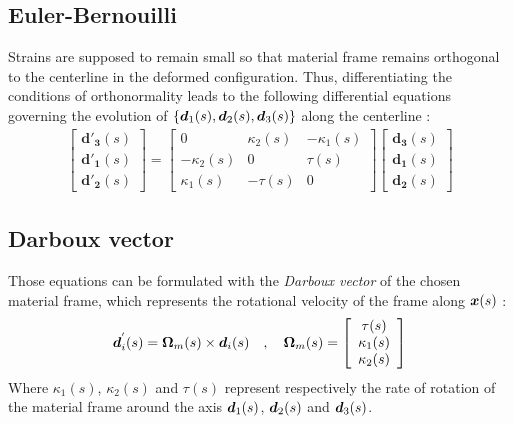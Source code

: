\subsection{Euler-Bernouilli}
Strains are supposed to remain small so that material frame remains orthogonal to the centerline in the deformed configuration. Thus, differentiating the conditions of orthonormality leads to the following differential equations governing the evolution of $\{\boldsymbol{d}_1 (s),\boldsymbol{d}_2 (s),\boldsymbol{d}_3 (s)\}$ along the centerline :
\begin{gather}
\left[\begin{array}{c}
\mathbf{d'_{3}}(s) \\
\mathbf{d'_{1}}(s) \\
\mathbf{d'_{2}}(s)
\end{array}\right]
=
\left[\begin{array}{ccc}
0 & \kappa_{2}(s) & -\kappa_{1}(s) \\
-\kappa_{2}(s) & 0 & \tau(s) \\
\kappa_{1}(s) & -\tau(s) & 0
\end{array}\right]
\left[\begin{array}{c}
\mathbf{d_{3}}(s) \\
\mathbf{d_{1}}(s) \\
\mathbf{d_{2}}(s)
\end{array}\right]
\end{gather}

\subsection{Darboux vector}
Those equations can be formulated with the \emph{Darboux vector} of the chosen material frame, which represents the rotational velocity of the frame along $\boldsymbol{x}(s)$ :
\begin{gather}
\boldsymbol{d}_{i}^{'}(s) = \boldsymbol{\Omega}_m(s) \times \boldsymbol{d}_i(s)
\quad,\quad
\boldsymbol{\Omega}_m(s) 
= 
\left[\begin{array}{c}
\tau(s) \\
\kappa_{1}(s) \\
\kappa_{2}(s)
\end{array}\right]
\end{gather}
Where $\kappa_1(s)$, $\kappa_2(s)$ and $\tau(s)$ represent respectively the rate of rotation of the material frame around the axis  $\boldsymbol{d}_1 (s)$, $\boldsymbol{d}_2 (s)$ and $\boldsymbol{d}_3 (s)$.


